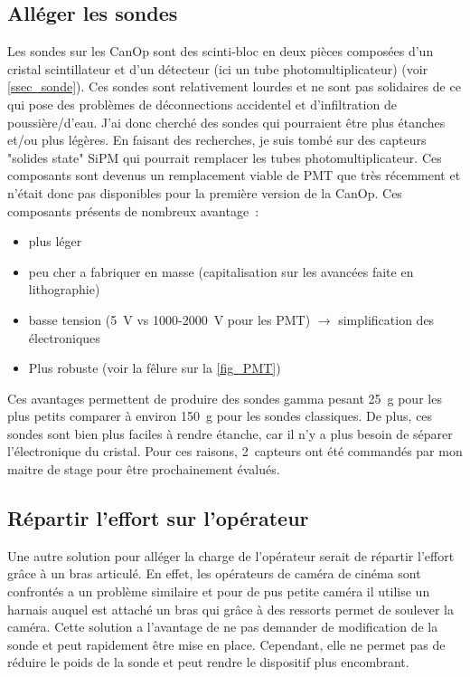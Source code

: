\subsection{Alléger les sondes}
Les sondes sur les CanOp sont des scinti-bloc en deux pièces composées d'un cristal scintillateur et d'un détecteur (ici un tube photomultiplicateur) (voir \cref{ssec_sonde}). Ces sondes sont relativement lourdes et ne sont pas solidaires de ce qui pose des problèmes de déconnections accidentel et d'infiltration de poussière/d'eau. %
J'ai donc cherché des sondes qui pourraient être plus étanches et/ou plus légères. En faisant des recherches, je suis tombé sur des capteurs "solides state" SiPM qui pourrait remplacer les tubes photomultiplicateur. Ces composants sont devenus un remplacement viable de PMT que très récemment et n'était donc pas disponibles pour la première version de la CanOp. Ces composants présents de nombreux avantage~:
\begin{itemize}
    \item plus léger
    \item peu cher a fabriquer en masse (capitalisation sur les avancées faite en lithographie)
    \item basse tension (5~V vs 1000-2000~V pour les PMT) $\rightarrow$ simplification des électroniques
    \item Plus robuste (voir la fêlure sur la \cref{fig_PMT})
\end{itemize}

Ces avantages permettent de produire des sondes gamma pesant 25~g pour les plus petits comparer à environ 150~g pour les sondes classiques. De plus, ces sondes sont bien plus faciles à rendre étanche, car il n'y a plus besoin de séparer l'électronique du cristal. Pour ces raisons, 2~capteurs ont été commandés par mon maitre de stage pour être prochainement évalués.

\subsection{Répartir l'effort sur l'opérateur}
Une autre solution pour alléger la charge de l'opérateur serait de répartir l'effort grâce à un bras articulé. En effet, les opérateurs de caméra de cinéma sont confrontés a un problème similaire et pour de pus petite caméra il utilise un harnais auquel est attaché un bras qui grâce à des ressorts permet de soulever la caméra. Cette solution a l'avantage de ne pas demander de modification de la sonde et peut rapidement être mise en place. Cependant, elle ne permet pas de réduire le poids de la sonde et peut rendre le dispositif plus encombrant.